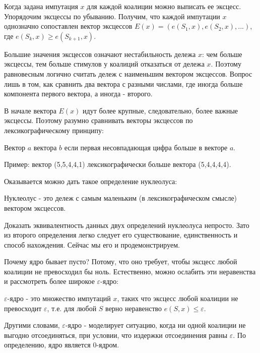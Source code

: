 Когда задана импутация $x$ для каждой коалиции можно выписать ее эксцесс. Упорядочим эксцессы по убыванию. Получим, что каждой импутации $x$ однозначно сопоставлен вектор эксцессов $E(x)=(e(S_{1},x),e(S_{2},x),...)$, где $e(S_{k},x)\geq e(S_{k+1},x)$.

Большие значения эксцессов означают нестабильность дележа $x$: чем больше эксцессы, тем больше стимулов у коалиций отказаться от дележа $x$. Поэтому равновесным логично считать дележ с наименьшим вектором эксцессов. Вопрос лишь в том, как сравнить два вектора с разными числами, где иногда больше компонента первого вектора, а иногда - второго.

В начале вектора $E(x)$ идут более крупные, следовательно, более важные эксцессы. Поэтому разумно сравнивать векторы эксцессов по лексикографическому принципу:

\begin{mydef}
Вектор $a$   вектора $b$ если первая несовпадающая цифра больше в векторе $a$.
\end{mydef}

Пример: вектор (5,5,4,4,1) лексикографически больше вектора (5,4,4,4,4).

Оказывается можно дать такое определение нуклеолуса:
\begin{mydef}
Нуклеолус  - это дележ с самым маленьким (в лексикографическом смысле) вектором эксцессов.
\end{mydef}


Доказать эквивалентность данных двух определений нуклеолуса непросто. Зато из второго определения легко следует его существование, единственность и способ нахождения. Сейчас мы его и продемонстрируем.

Почему ядро бывает пусто? Потому, что оно требует, чтобы эксцесс любой коалиции не превосходил бы ноль. Естественно, можно ослабить эти неравенства и рассмотреть более широкое $\varepsilon$-ядро:

\begin{mydef}
$\varepsilon$-ядро  - это множество импутаций $x$, таких что эксцесс любой коалиции не превосходит $\varepsilon$, т.е. для любой $S$ верно неравенство $e(S,x)\leq \varepsilon$.
\end{mydef}

Другими словами, $\varepsilon$-ядро - моделирует ситуацию, когда ни одной коалиции не выгодно отсоединяться, при условии, что издержки отсоединения равны $\varepsilon$. По определению, ядро является $0$-ядром. 

